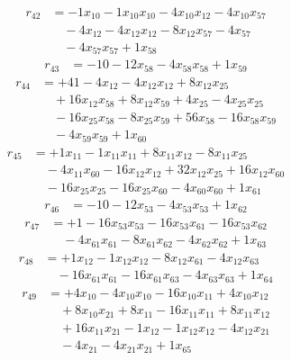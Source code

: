 \[\begin{aligned}
r_{42} &= - 1 x_{10} - 1 x_{10} x_{10} - 4 x_{10} x_{12} - 4 x_{10} x_{57} \\
 &\quad - 4 x_{12} - 4 x_{12} x_{12} - 8 x_{12} x_{57} - 4 x_{57} \\
 &\quad - 4 x_{57} x_{57} + 1 x_{58}
\end{aligned}\]
\[\begin{aligned}
r_{43} &= - 10 - 12 x_{58} - 4 x_{58} x_{58} + 1 x_{59}
\end{aligned}\]
\[\begin{aligned}
r_{44} &= + 41 - 4 x_{12} - 4 x_{12} x_{12} + 8 x_{12} x_{25} \\
 &\quad + 16 x_{12} x_{58} + 8 x_{12} x_{59} + 4 x_{25} - 4 x_{25} x_{25} \\
 &\quad - 16 x_{25} x_{58} - 8 x_{25} x_{59} + 56 x_{58} - 16 x_{58} x_{59} \\
 &\quad - 4 x_{59} x_{59} + 1 x_{60}
\end{aligned}\]
\[\begin{aligned}
r_{45} &= + 1 x_{11} - 1 x_{11} x_{11} + 8 x_{11} x_{12} - 8 x_{11} x_{25} \\
 &\quad - 4 x_{11} x_{60} - 16 x_{12} x_{12} + 32 x_{12} x_{25} + 16 x_{12} x_{60} \\
 &\quad - 16 x_{25} x_{25} - 16 x_{25} x_{60} - 4 x_{60} x_{60} + 1 x_{61}
\end{aligned}\]
\[\begin{aligned}
r_{46} &= - 10 - 12 x_{53} - 4 x_{53} x_{53} + 1 x_{62}
\end{aligned}\]
\[\begin{aligned}
r_{47} &= + 1 - 16 x_{53} x_{53} - 16 x_{53} x_{61} - 16 x_{53} x_{62} \\
 &\quad - 4 x_{61} x_{61} - 8 x_{61} x_{62} - 4 x_{62} x_{62} + 1 x_{63}
\end{aligned}\]
\[\begin{aligned}
r_{48} &= + 1 x_{12} - 1 x_{12} x_{12} - 8 x_{12} x_{61} - 4 x_{12} x_{63} \\
 &\quad - 16 x_{61} x_{61} - 16 x_{61} x_{63} - 4 x_{63} x_{63} + 1 x_{64}
\end{aligned}\]
\[\begin{aligned}
r_{49} &= + 4 x_{10} - 4 x_{10} x_{10} - 16 x_{10} x_{11} + 4 x_{10} x_{12} \\
 &\quad + 8 x_{10} x_{21} + 8 x_{11} - 16 x_{11} x_{11} + 8 x_{11} x_{12} \\
 &\quad + 16 x_{11} x_{21} - 1 x_{12} - 1 x_{12} x_{12} - 4 x_{12} x_{21} \\
 &\quad - 4 x_{21} - 4 x_{21} x_{21} + 1 x_{65}
\end{aligned}\]
